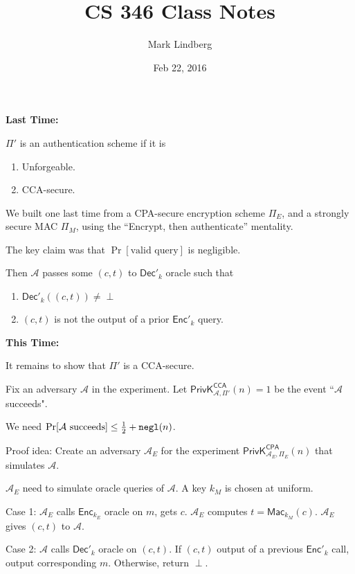 \documentclass[12pt]{article}
\newcommand{\AAA}{\mathcal{A}}
\newcommand{\Enc}{\mathsf{Enc}}
\newcommand{\Dec}{\mathsf{Dec}}
\newcommand{\Mac}{\mathsf{Mac}}
\newcommand{\ExptCcaArgs}[2]{\mathsf{PrivK}^{\mathsf{CCA}}_{#1,#2}}
\newcommand{\ExptCpaArgs}[2]{\mathsf{PrivK}^{\mathsf{CPA}}_{#1,#2}}
\newcommand{\negl}{{\tt negl}}
\begin{document}
\title{CS 346 Class Notes}
\date{Feb 22, 2016}
\author{Mark Lindberg}
\maketitle
\thispagestyle{fancy}

{\bf Last Time:}

$\Pi'$ is an authentication scheme if it is\begin{enumerate}

\item Unforgeable.

\item CCA-secure.

\end{enumerate}

We built one last time from a CPA-secure encryption scheme $\Pi_E$, and a strongly secure MAC $\Pi_M$, using the ``Encrypt, then authenticate'' mentality.

The key claim was that $\Pr[\text{valid query}]$ is negligible.

Then $\AAA$ passes some $(c,t)$ to $\Dec'_k$ oracle such that\begin{enumerate}

\item $\Dec'_k((c,t))\neq\perp$

\item $(c,t)$ is not the output of a prior $\Enc'_k$ query.

\end{enumerate}

{\bf This Time:}

It remains to show that $\Pi'$ is a CCA-secure.

Fix an adversary $\AAA$ in the experiment. Let $\ExptCcaArgs{\AAA}{\Pi'}(n)=1$ be the event ``$\AAA$ succeeds".

We need $\Pr[\AAA\text{ succeeds}]\leq\frac{1}{2}+\negl(n)$.

Proof idea: Create an adversary $\AAA_E$ for the experiment $\ExptCpaArgs{\AAA_E}{\Pi_E}(n)$ that simulates $\AAA$.

$\AAA_E$ need to simulate oracle queries of $\AAA$. A key $k_M$ is chosen at uniform.

Case 1: $\AAA_E$ calls $\Enc_{k_E}$ oracle on $m$, gets $c$. $\AAA_E$ computes $t=\Mac_{k_M}(c)$. $\AAA_E$ gives $(c,t)$ to $\AAA$.

Case 2: $\AAA$ calls $\Dec'_k$ oracle on $(c,t)$. If $(c,t)$ output of a previous $\Enc'_k$ call, output corresponding $m$. Otherwise, return $\perp$.
\end{document}
